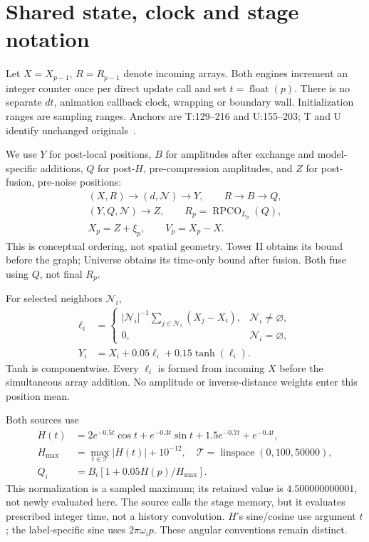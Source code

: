 \documentclass[11pt,a4paper]{article}
\newcommand{\src}[2]{\textsf{#1:#2}}
\begin{document}
\section{Shared state, clock and stage notation}\label{sec:common}
Let \(X=X_{p-1}\), \(R=R_{p-1}\) denote incoming arrays. Both engines increment an integer counter once per direct update call and set \(t=\operatorname{float}(p)\). There is no separate \(dt\), animation callback clock, wrapping or boundary wall. Initialization ranges are sampling ranges. Anchors are \src{T}{129--216} and \src{U}{155--203}; T and U identify unchanged originals~\citep{towersource,universesource}.

We use \(Y\) for post-local positions, \(B\) for amplitudes after exchange and model-specific additions, \(Q\) for post-\(H\), pre-compression amplitudes, and \(Z\) for post-fusion, pre-noise positions:
\begin{equation}\label{eq:stages}
\begin{gathered}
(X,R)\longrightarrow(d,\mathcal N)\longrightarrow Y,\qquad
R\longrightarrow B\longrightarrow Q,\\
(Y,Q,\mathcal N)\longrightarrow Z,\qquad
R_p=\operatorname{RPCO}_{L_p}(Q),\\
X_p=Z+\xi_p,\qquad V_p=X_p-X.
\end{gathered}
\end{equation}
This is conceptual ordering, not spatial geometry. Tower II obtains its bound before the graph; Universe obtains its time-only bound after fusion. Both fuse using \(Q\), not final \(R_p\).

For selected neighbors \(\mathcal N_i\),
\begin{align}
\ell_i&=\begin{cases}
|\mathcal N_i|^{-1}\displaystyle\sum_{j\in\mathcal N_i}(X_j-X_i),&
\mathcal N_i\ne\varnothing,\\0,&\mathcal N_i=\varnothing,
\end{cases}\label{eq:lap}\\
Y_i&=X_i+0.05\ell_i+0.15\tanh(\ell_i).\label{eq:local}
\end{align}
Tanh is componentwise. Every \(\ell_i\) is formed from incoming \(X\) before the simultaneous array addition. No amplitude or inverse-distance weights enter this position mean.

Both sources use
\begin{align}
H(t)&=2e^{-0.5t}\cos t+e^{-0.3t}\sin t+
1.5e^{-0.7t}+e^{-0.4t},\label{eq:H}\\
H_{\max}&=\max_{t\in\mathcal T}|H(t)|+10^{-12},\quad
\mathcal T=\operatorname{linspace}(0,100,50000),\label{eq:Hmax}\\
Q_i&=B_i[1+0.05H(p)/H_{\max}].\label{eq:Q}
\end{align}
This normalization is a sampled maximum; its retained value is \(4.500000000001\), not newly evaluated here. The source calls the stage memory, but it evaluates prescribed integer time, not a history convolution. \(H\)'s sine/cosine use argument \(t\); the label-specific sine uses \(2\pi\omega_i p\). These angular conventions remain distinct.
\end{document}

